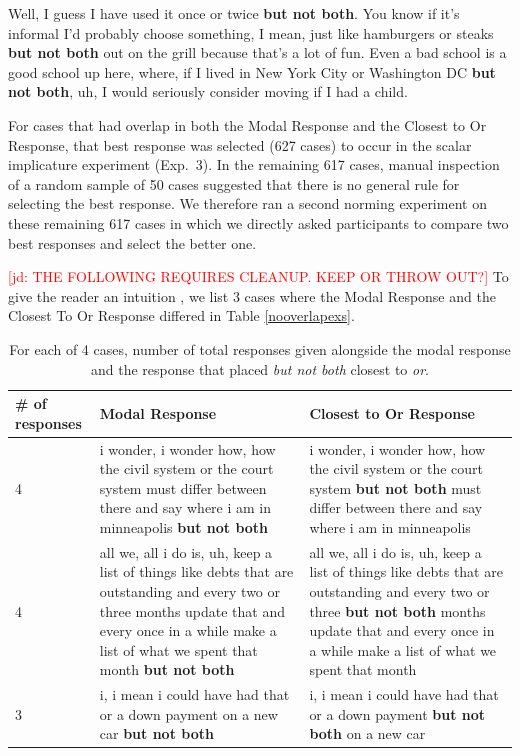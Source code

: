 \documentclass[11pt,letterpaper]{article}
\newcommand{\jd}[1]{\textcolor{Red}{[jd: #1]}}
\newcommand{\tableref}[1]{Table \ref{#1}}
\begin{document}
\begin{exe}
	\ex\label{completeoverlapexs}
	\begin{xlist}
		\ex Well, I guess I have used it once or twice \textbf{but not both}.
		\ex You know if it's informal I'd probably choose something, I mean, just like hamburgers or steaks \textbf{but not both} out on the grill because that's a lot of fun.
		\ex Even a bad school is a good school up here, where, if I lived in New York City or Washington DC \textbf{but not both}, uh, I would seriously consider moving if I had a child.
	\end{xlist}
\end{exe}

 

For cases that had overlap in both the Modal Response and the Closest to Or Response, that best response was selected (627 cases) to occur in the scalar implicature experiment (Exp.~3). In the remaining 617 cases, manual inspection of a random sample of 50 cases suggested that there is no general rule for selecting the best response. We therefore ran a second norming experiment on these remaining 617 cases in which we directly asked participants to compare two best responses and select the better one.



\jd{THE FOLLOWING REQUIRES CLEANUP. KEEP OR THROW OUT?}
To give the reader an intuition , we list 3 cases where the Modal Response and the Closest To Or Response differed in \tableref{nooverlapexs}.

\begin{table}
\caption{For each of 4 cases, number of total responses given alongside the modal response and the response that placed \emph{but not both} closest to \emph{or}.}
\centering
\begin{tabular}{l p{7cm} p{7cm}}
	\toprule
	\# of responses & Modal Response & Closest to Or Response \\
	\midrule
	4 & i wonder, i wonder how, how the civil system or the court system must differ between there and say where i am in minneapolis \textbf{but not both}  & i wonder, i wonder how, how the civil system or the court system \textbf{but not both} must differ between there and say where i am in minneapolis  \\
	4 & all we, all i do is, uh, keep a list of things like debts that are outstanding and every two or three months update that and every once in a while make a list of what we spent that month  \textbf{but not both} & all we, all i do is, uh, keep a list of things like debts that are outstanding and every two or three  \textbf{but not both} months update that and every once in a while make a list of what we spent that month\\
	3 & i, i mean i could have had that or a down payment on a new car \textbf{but not both} & i, i mean i could have had that or a down payment \textbf{but not both} on a new car\\
	\bottomrule
\end{tabular}
\end{table}
\end{document}
